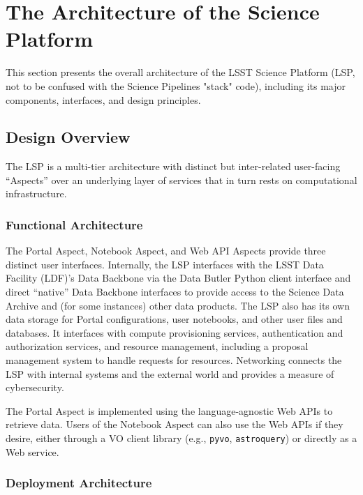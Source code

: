 \section{The Architecture of the Science Platform}\label{architecture}

This section presents the overall architecture of the LSST Science Platform
(LSP, not to be confused with the Science Pipelines "stack" code), including
its major components, interfaces, and design principles.

\subsection{Design Overview}\label{design-overview}

The LSP is a multi-tier architecture with distinct but inter-related
user-facing ``Aspects'' over an underlying layer of services that in turn
rests on computational infrastructure.

\subsubsection{Functional Architecture}\label{functional-architecture}

The Portal Aspect, Notebook Aspect, and Web API Aspects provide three
distinct user interfaces.
Internally, the LSP interfaces with the LSST Data Facility (LDF)'s Data
Backbone via the Data Butler Python client interface and direct
``native'' Data Backbone
interfaces to provide access to the Science Data Archive and (for some
instances) other data products.
The LSP also has its own data storage for
Portal configurations, user notebooks, and other user files and databases.
It interfaces with compute provisioning services, authentication and
authorization services, and resource management, including a proposal
management system to handle requests for resources.
Networking connects the LSP with internal
systems and the external world and provides a measure of cybersecurity.

The Portal Aspect is implemented using the language-agnostic Web APIs to
retrieve data.
Users of the Notebook Aspect can also use the Web APIs if they
desire, either through a VO client library (e.g., \texttt{pyvo},
\texttt{astroquery}) or directly as a Web service.

\subsubsection{Deployment Architecture}\label{deployment-architecture}

